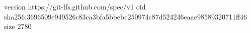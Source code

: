 version https://git-lfs.github.com/spec/v1
oid sha256:3696509e949526c83ca3bfa5bbebc250974c87d524246eaae98589320711ff46
size 2780
